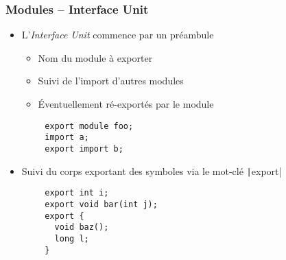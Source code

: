 \documentclass[C++.tex]{subfiles}
\begin{document}
\begin{frame}[fragile]
	\frametitle{Modules -- Interface Unit}
	\begin{itemize}
		\item L'\textit{Interface Unit} commence par un préambule
		\begin{itemize}
			\item Nom du module à exporter
			\item Suivi de l'import d'autres modules
			\item Éventuellement ré-exportés par le module
		\end{itemize}
	\end{itemize}

	\begin{verbatim}
		export module foo;
		import a;
		export import b;
	\end{verbatim}

	\begin{itemize}
		\item Suivi du corps exportant des symboles via le mot-clé \texttt|export|
	\end{itemize}


	\begin{verbatim}
		export int i;
		export void bar(int j);
		export {
		  void baz();
		  long l;
		}
	\end{verbatim}
\end{frame}
\end{document}
